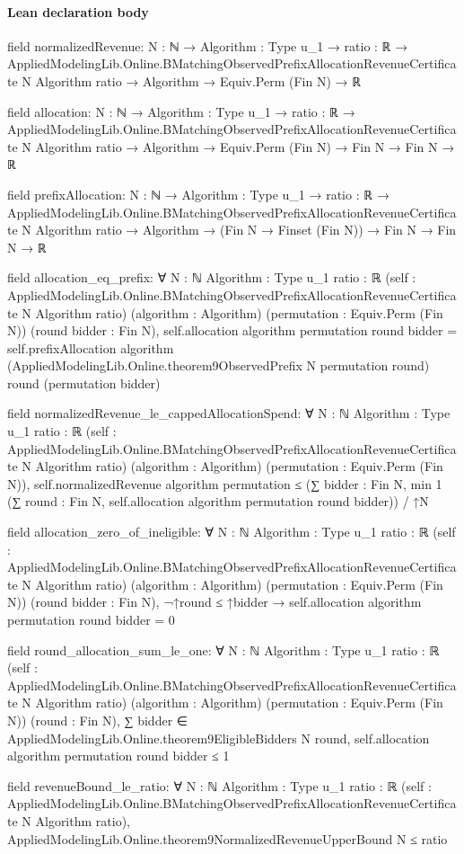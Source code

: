 \documentclass[10pt]{article}
\begin{document}
\paragraph{Lean declaration body}
\begin{ReviewVerbatim}
field normalizedRevenue:
{N : ℕ} →
  {Algorithm : Type u_1} →
    {ratio : ℝ} →
      AppliedModelingLib.Online.BMatchingObservedPrefixAllocationRevenueCertificate N Algorithm ratio →
        Algorithm → Equiv.Perm (Fin N) → ℝ

field allocation:
{N : ℕ} →
  {Algorithm : Type u_1} →
    {ratio : ℝ} →
      AppliedModelingLib.Online.BMatchingObservedPrefixAllocationRevenueCertificate N Algorithm ratio →
        Algorithm → Equiv.Perm (Fin N) → Fin N → Fin N → ℝ

field prefixAllocation:
{N : ℕ} →
  {Algorithm : Type u_1} →
    {ratio : ℝ} →
      AppliedModelingLib.Online.BMatchingObservedPrefixAllocationRevenueCertificate N Algorithm ratio →
        Algorithm → (Fin N → Finset (Fin N)) → Fin N → Fin N → ℝ

field allocation_eq_prefix:
∀ {N : ℕ} {Algorithm : Type u_1} {ratio : ℝ}
  (self : AppliedModelingLib.Online.BMatchingObservedPrefixAllocationRevenueCertificate N Algorithm ratio)
  (algorithm : Algorithm) (permutation : Equiv.Perm (Fin N)) (round bidder : Fin N),
  self.allocation algorithm permutation round bidder =
    self.prefixAllocation algorithm (AppliedModelingLib.Online.theorem9ObservedPrefix N permutation round) round
      (permutation bidder)

field normalizedRevenue_le_cappedAllocationSpend:
∀ {N : ℕ} {Algorithm : Type u_1} {ratio : ℝ}
  (self : AppliedModelingLib.Online.BMatchingObservedPrefixAllocationRevenueCertificate N Algorithm ratio)
  (algorithm : Algorithm) (permutation : Equiv.Perm (Fin N)),
  self.normalizedRevenue algorithm permutation ≤
    (∑ bidder : Fin N, min 1 (∑ round : Fin N, self.allocation algorithm permutation round bidder)) / ↑N

field allocation_zero_of_ineligible:
∀ {N : ℕ} {Algorithm : Type u_1} {ratio : ℝ}
  (self : AppliedModelingLib.Online.BMatchingObservedPrefixAllocationRevenueCertificate N Algorithm ratio)
  (algorithm : Algorithm) (permutation : Equiv.Perm (Fin N)) (round bidder : Fin N),
  ¬↑round ≤ ↑bidder → self.allocation algorithm permutation round bidder = 0

field round_allocation_sum_le_one:
∀ {N : ℕ} {Algorithm : Type u_1} {ratio : ℝ}
  (self : AppliedModelingLib.Online.BMatchingObservedPrefixAllocationRevenueCertificate N Algorithm ratio)
  (algorithm : Algorithm) (permutation : Equiv.Perm (Fin N)) (round : Fin N),
  ∑ bidder ∈ AppliedModelingLib.Online.theorem9EligibleBidders N round,
      self.allocation algorithm permutation round bidder ≤
    1

field revenueBound_le_ratio:
∀ {N : ℕ} {Algorithm : Type u_1} {ratio : ℝ}
  (self : AppliedModelingLib.Online.BMatchingObservedPrefixAllocationRevenueCertificate N Algorithm ratio),
  AppliedModelingLib.Online.theorem9NormalizedRevenueUpperBound N ≤ ratio
\end{ReviewVerbatim}
\end{document}
